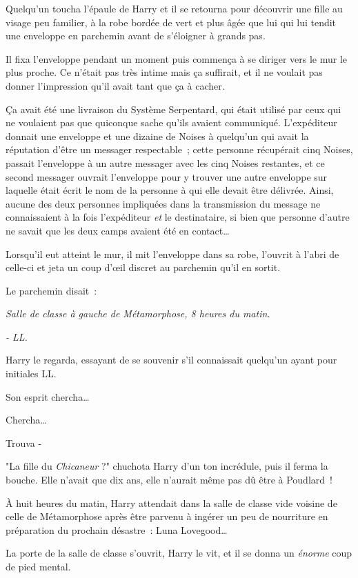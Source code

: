 Quelqu'un toucha l'épaule de Harry et il se retourna pour découvrir une fille au visage peu familier, à la robe bordée de vert et plus âgée que lui qui lui tendit une enveloppe en parchemin avant de s'éloigner à grands pas.

Il fixa l'enveloppe pendant un moment puis commença à se diriger vers le mur le plus proche. Ce n'était pas très intime mais ça suffirait, et il ne voulait pas donner l'impression qu'il avait tant que ça à cacher.

Ça avait été une livraison du Système Serpentard, qui était utilisé par ceux qui ne voulaient pas que quiconque sache qu'ils avaient communiqué. L'expéditeur donnait une enveloppe et une dizaine de Noises à quelqu'un qui avait la réputation d'être un messager respectable~; cette personne récupérait cinq Noises, passait l'enveloppe à un autre messager avec les cinq Noises restantes, et ce second messager ouvrait l'enveloppe pour y trouver une autre enveloppe sur laquelle était écrit le nom de la personne à qui elle devait être délivrée. Ainsi, aucune des deux personnes impliquées dans la transmission du message ne connaissaient à la fois l'expéditeur \emph{et} le destinataire, si bien que personne d'autre ne savait que les deux camps avaient été en contact…

Lorsqu'il eut atteint le mur, il mit l'enveloppe dans sa robe, l'ouvrit à l'abri de celle-ci et jeta un coup d'œil discret au parchemin qu'il en sortit.

Le parchemin disait~:

\emph{Salle de classe à gauche de Métamorphose, 8 heures du matin.}

\emph{- LL.}

Harry le regarda, essayant de se souvenir s'il connaissait quelqu'un ayant pour initiales LL.

Son esprit chercha…

Chercha…

Trouva -

"La fille du \emph{Chicaneur} ?" chuchota Harry d'un ton incrédule, puis il ferma la bouche. Elle n'avait que dix ans, elle n'aurait même pas dû être à Poudlard~!


À huit heures du matin, Harry attendait dans la salle de classe vide voisine de celle de Métamorphose après être parvenu à ingérer un peu de nourriture en préparation du prochain désastre~: Luna Lovegood…

La porte de la salle de classe s'ouvrit, Harry le vit, et il se donna un \emph{énorme} coup de pied mental.

